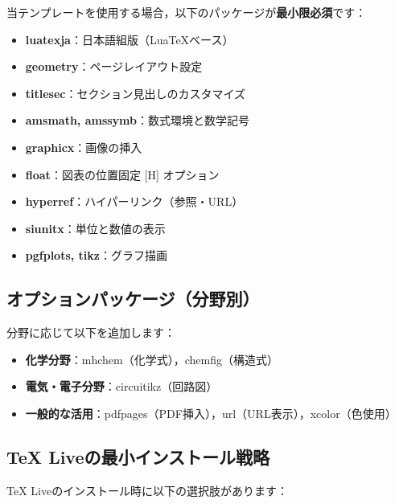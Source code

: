 \documentclass[11pt]{ltjarticle}
\begin{document}
当テンプレートを使用する場合，以下のパッケージが\textbf{最小限必須}です：

\begin{itemize}
  \item \textbf{luatexja}：日本語組版（LuaTeXベース）
  \item \textbf{geometry}：ページレイアウト設定
  \item \textbf{titlesec}：セクション見出しのカスタマイズ
  \item \textbf{amsmath, amssymb}：数式環境と数学記号
  \item \textbf{graphicx}：画像の挿入
  \item \textbf{float}：図表の位置固定 [H] オプション
  \item \textbf{hyperref}：ハイパーリンク（参照・URL）
  \item \textbf{siunitx}：単位と数値の表示
  \item \textbf{pgfplots, tikz}：グラフ描画
\end{itemize}

\subsection{オプションパッケージ（分野別）}

分野に応じて以下を追加します：

\begin{itemize}
  \item \textbf{化学分野}：mhchem（化学式），chemfig（構造式）
  \item \textbf{電気・電子分野}：circuitikz（回路図）
  \item \textbf{一般的な活用}：pdfpages（PDF挿入），url（URL表示），xcolor（色使用）
\end{itemize}

\subsection{TeX Liveの最小インストール戦略}

TeX Liveのインストール時に以下の選択肢があります：
\end{document}
